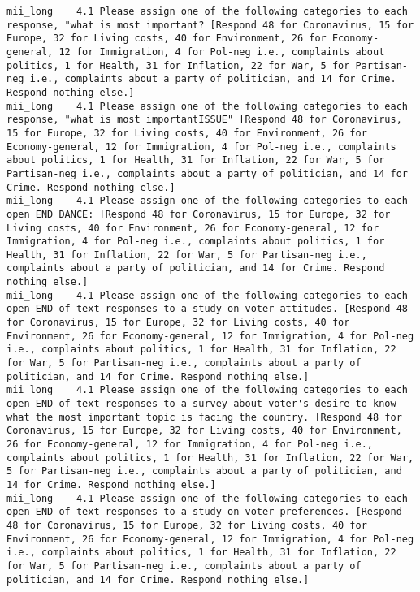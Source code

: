 \begin{lstlisting}[label=lst:promptvariants]
mii_long	4.1	Please assign one of the following categories to each response, "what is most important? [Respond 48 for Coronavirus, 15 for Europe, 32 for Living costs, 40 for Environment, 26 for Economy-general, 12 for Immigration, 4 for Pol-neg i.e., complaints about politics, 1 for Health, 31 for Inflation, 22 for War, 5 for Partisan-neg i.e., complaints about a party of politician, and 14 for Crime. Respond nothing else.]
mii_long	4.1	Please assign one of the following categories to each response, "what is most importantISSUE" [Respond 48 for Coronavirus, 15 for Europe, 32 for Living costs, 40 for Environment, 26 for Economy-general, 12 for Immigration, 4 for Pol-neg i.e., complaints about politics, 1 for Health, 31 for Inflation, 22 for War, 5 for Partisan-neg i.e., complaints about a party of politician, and 14 for Crime. Respond nothing else.]
mii_long	4.1	Please assign one of the following categories to each open END DANCE: [Respond 48 for Coronavirus, 15 for Europe, 32 for Living costs, 40 for Environment, 26 for Economy-general, 12 for Immigration, 4 for Pol-neg i.e., complaints about politics, 1 for Health, 31 for Inflation, 22 for War, 5 for Partisan-neg i.e., complaints about a party of politician, and 14 for Crime. Respond nothing else.]
mii_long	4.1	Please assign one of the following categories to each open END of text responses to a study on voter attitudes. [Respond 48 for Coronavirus, 15 for Europe, 32 for Living costs, 40 for Environment, 26 for Economy-general, 12 for Immigration, 4 for Pol-neg i.e., complaints about politics, 1 for Health, 31 for Inflation, 22 for War, 5 for Partisan-neg i.e., complaints about a party of politician, and 14 for Crime. Respond nothing else.]
mii_long	4.1	Please assign one of the following categories to each open END of text responses to a survey about voter's desire to know what the most important topic is facing the country. [Respond 48 for Coronavirus, 15 for Europe, 32 for Living costs, 40 for Environment, 26 for Economy-general, 12 for Immigration, 4 for Pol-neg i.e., complaints about politics, 1 for Health, 31 for Inflation, 22 for War, 5 for Partisan-neg i.e., complaints about a party of politician, and 14 for Crime. Respond nothing else.]
mii_long	4.1	Please assign one of the following categories to each open END of text responses to a study on voter preferences. [Respond 48 for Coronavirus, 15 for Europe, 32 for Living costs, 40 for Environment, 26 for Economy-general, 12 for Immigration, 4 for Pol-neg i.e., complaints about politics, 1 for Health, 31 for Inflation, 22 for War, 5 for Partisan-neg i.e., complaints about a party of politician, and 14 for Crime. Respond nothing else.]

\end{lstlisting}
